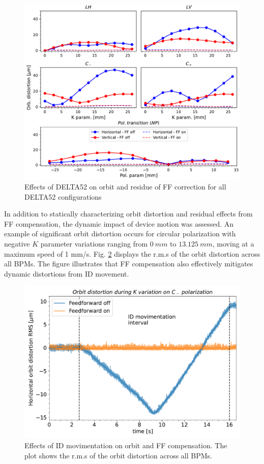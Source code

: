 \documentclass[a4paper,
               keeplastbox,   %
               ]{jacow}
\begin{document}
\begin{figure}[]
    \centering
   \includegraphics[width=0.9\columnwidth]{THPS18_f2.pdf}
   \caption{Effects of DELTA52 on orbit and residue of FF correction for all DELTA52 configurations}
   \label{fig:orbit_slow}
\end{figure}

In addition to statically characterizing orbit distortion and residual effects from FF compensation, the dynamic impact of device motion was assessed. An example of significant orbit distortion occurs for circular polarization with negative $K$ parameter variations ranging from $\SI{0}{mm}$ to $\SI{13.125}{mm}$, moving at a maximum speed of 1 mm/s. Fig. \ref{fig:orbit_fast} displays the r.m.s of the orbit distortion across all BPMs. The figure illustrates that FF compensation also effectively mitigates dynamic distortions from ID movement.

\begin{figure}[]
    \centering
   \includegraphics[width=0.68\columnwidth]{THPS18_f3.pdf}
   \caption{Effects of ID movimentation on orbit and FF compensation. The plot shows the r.m.s of the orbit distortion across all BPMs.}
   \label{fig:orbit_fast}
\end{figure}
\end{document}

